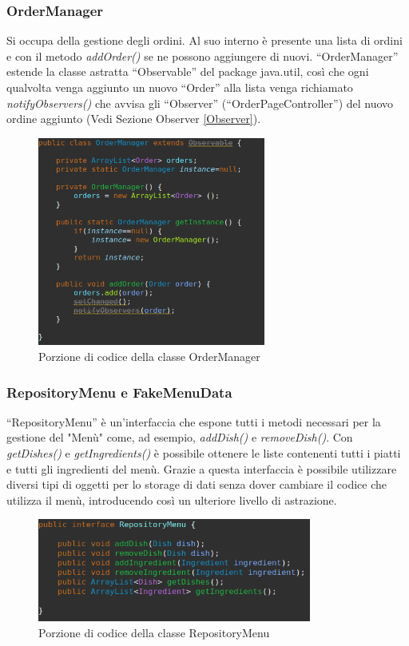 \documentclass{article}
\begin{document}
\subsubsection{OrderManager}

Si occupa della gestione degli ordini. Al suo interno \`e presente una lista di ordini e con il metodo \textit{addOrder()} se ne possono aggiungere di nuovi. ``OrderManager'' estende la classe astratta ``Observable'' del package java.util, cos\`i che ogni qualvolta venga aggiunto un nuovo ``Order'' alla lista venga richiamato \textit{notifyObservers()} che avvisa gli ``Observer'' (``OrderPageController'') del nuovo ordine aggiunto (Vedi Sezione Observer \ref{Observer}). 

\newpage

\begin{figure}[!h]
\centering
\includegraphics[width= 7.5cm]{"Codice/OrderManager.PNG"}
\caption{Porzione di codice della classe OrderManager}
\end{figure}

\subsubsection{RepositoryMenu e FakeMenuData}

``RepositoryMenu'' \`e un'interfaccia che espone tutti i metodi necessari per la gestione del "Men\`u" come, ad esempio, \textit{addDish()} e \textit{removeDish()}. Con \textit{getDishes()} e \textit{getIngredients()} \`e possibile ottenere le liste contenenti tutti i piatti e tutti gli ingredienti del men\`u. Grazie a questa interfaccia \`e possibile utilizzare diversi tipi di oggetti per lo storage di dati senza dover cambiare il codice che utilizza il men\`u, introducendo cos\`i un ulteriore livello di astrazione.


\begin{figure}[!h]
\centering
\includegraphics[width= 9cm]{"Codice/RepositoryMenu.PNG"}
\caption{Porzione di codice della classe RepositoryMenu}
\end{figure}
\end{document}
